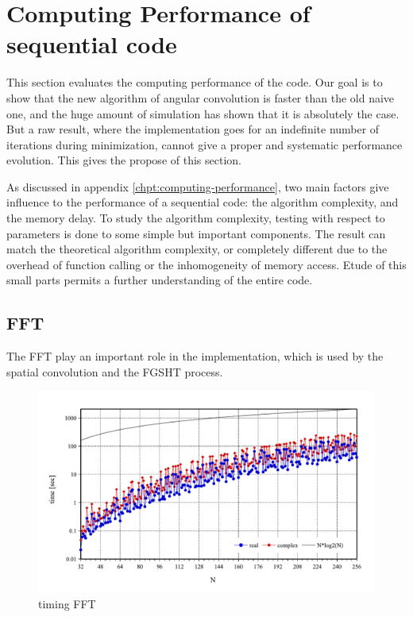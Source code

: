 
\chapter{Computing Performance of sequential code\label{chpt:seq-code-performance}}

This section evaluates the computing performance of the code. Our
goal is to show that the new algorithm of angular convolution is faster
than the old naive one, and the huge amount of simulation has shown
that it is absolutely the case. But a raw result, where the implementation
goes for an indefinite number of iterations during minimization, cannot
give a proper and systematic performance evolution. This gives the
propose of this section. 

As discussed in appendix \ref{chpt:computing-performance}, two main
factors give influence to the performance of a sequential code: the
algorithm complexity, and the memory delay. To study the algorithm
complexity, testing with respect to parameters is done to some simple
but important components. The result can match the theoretical algorithm
complexity, or completely different due to the overhead of function
calling or the inhomogeneity of memory access. Etude of this small
parts permits a further understanding of the entire code.

\section{FFT}

The \acs{FFT} play an important role in the implementation, which
is used by the spatial convolution and the \acs{FGSHT} process. 

\begin{figure}[H]
\begin{centering}
\includegraphics[bb=0bp 20bp 567bp 310bp,width=1\columnwidth]{_figure/results/fftw_timing}
\par\end{centering}
\caption{timing FFT\label{fig:timing-FFT}}
\end{figure}

